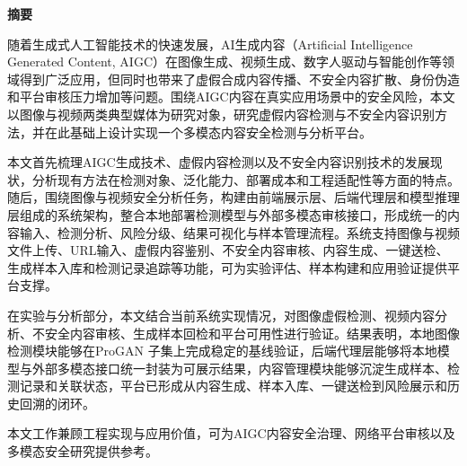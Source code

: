 \begin{center}
  {\heiti{}\bfseries 摘\qquad 要}
\end{center}

\vspace{1.5\baselineskip}

随着生成式人工智能技术的快速发展，AI生成内容（Artificial Intelligence Generated Content, AIGC）在图像生成、视频生成、数字人驱动与智能创作等领域得到广泛应用，但同时也带来了虚假合成内容传播、不安全内容扩散、身份伪造和平台审核压力增加等问题。围绕AIGC内容在真实应用场景中的安全风险，本文以图像与视频两类典型媒体为研究对象，研究虚假内容检测与不安全内容识别方法，并在此基础上设计实现一个多模态内容安全检测与分析平台。

本文首先梳理AIGC生成技术、虚假内容检测以及不安全内容识别技术的发展现状，分析现有方法在检测对象、泛化能力、部署成本和工程适配性等方面的特点。随后，围绕图像与视频安全分析任务，构建由前端展示层、后端代理层和模型推理层组成的系统架构，整合本地部署检测模型与外部多模态审核接口，形成统一的内容输入、检测分析、风险分级、结果可视化与样本管理流程。系统支持图像与视频文件上传、URL输入、虚假内容鉴别、不安全内容审核、内容生成、一键送检、生成样本入库和检测记录追踪等功能，可为实验评估、样本构建和应用验证提供平台支撑。

在实验与分析部分，本文结合当前系统实现情况，对图像虚假检测、视频内容分析、不安全内容审核、生成样本回检和平台可用性进行验证。结果表明，本地图像检测模块能够在ProGAN 子集上完成稳定的基线验证，后端代理层能够将本地模型与外部多模态接口统一封装为可展示结果，内容管理模块能够沉淀生成样本、检测记录和关联状态，平台已形成从内容生成、样本入库、一键送检到风险展示和历史回溯的闭环。

本文工作兼顾工程实现与应用价值，可为AIGC内容安全治理、网络平台审核以及多模态安全研究提供参考。

\vspace{1em}
